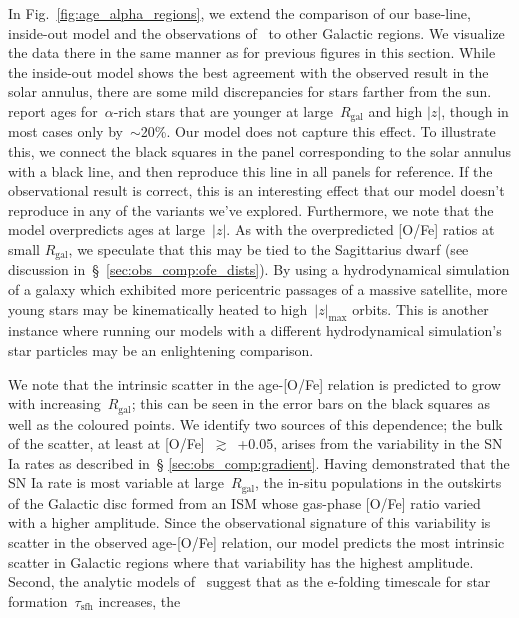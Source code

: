 \documentclass[fleqn, usenatbib]{mnras}
\begin{document}
In Fig.~\ref{fig:age_alpha_regions}, we extend the comparison of our base-line, 
inside-out model and the observations of~\citet{Feuillet2019} to other 
Galactic regions. We visualize the data there in the same manner as for 
previous figures in this section. While the inside-out model shows the best 
agreement with the observed result in the solar annulus, there are some mild 
discrepancies for stars farther from the sun.~\citet{Feuillet2019} report ages 
for~$\alpha$-rich stars that are younger at large~$R_\text{gal}$ and high 
$\left|z\right|$, though in most cases only by~$\sim$20\%. Our model does not 
capture this effect. To illustrate this, we connect the black squares in the 
panel corresponding to the solar annulus with a black line, and then reproduce 
this line in all panels for reference. If the observational result is correct, 
this is an interesting effect that our model doesn't reproduce in any of the 
variants we've explored. Furthermore, we note that the model overpredicts ages 
at large~$\left|z\right|$. As with the overpredicted [O/Fe] ratios at small 
$R_\text{gal}$, we speculate that this may be tied to the Sagittarius dwarf 
(see discussion in~\S~\ref{sec:obs_comp:ofe_dists}). By using a hydrodynamical 
simulation of a 
galaxy which exhibited more pericentric passages of a massive satellite, more 
young stars may be kinematically heated to high~$\left|z\right|_\text{max}$ 
orbits. This is another instance where running our models with a different 
hydrodynamical simulation's star particles may be an enlightening comparison. 
\par 
We note that the intrinsic scatter in the age-[O/Fe] relation is predicted to 
grow with increasing~$R_\text{gal}$; this can be seen in the error bars on the 
black squares as well as the coloured points. We identify two sources of this 
dependence; the bulk of the scatter, at least at [O/Fe]~$\gtrsim$~+0.05, arises 
from the variability in the SN Ia rates as described in~\S 
\ref{sec:obs_comp:gradient}. Having demonstrated that the SN Ia rate is most 
variable at large~$R_\text{gal}$, the in-situ populations in the outskirts of 
the Galactic disc formed from an ISM whose gas-phase [O/Fe] ratio varied with 
a higher amplitude. Since the observational signature of this variability is 
scatter in the observed age-[O/Fe] relation, our model predicts the most 
intrinsic scatter in Galactic regions where that variability has the highest 
amplitude. Second, the analytic models of~\citet{Weinberg2017} suggest that 
as the e-folding timescale for star formation~$\tau_\text{sfh}$ increases, the 
\end{document}
